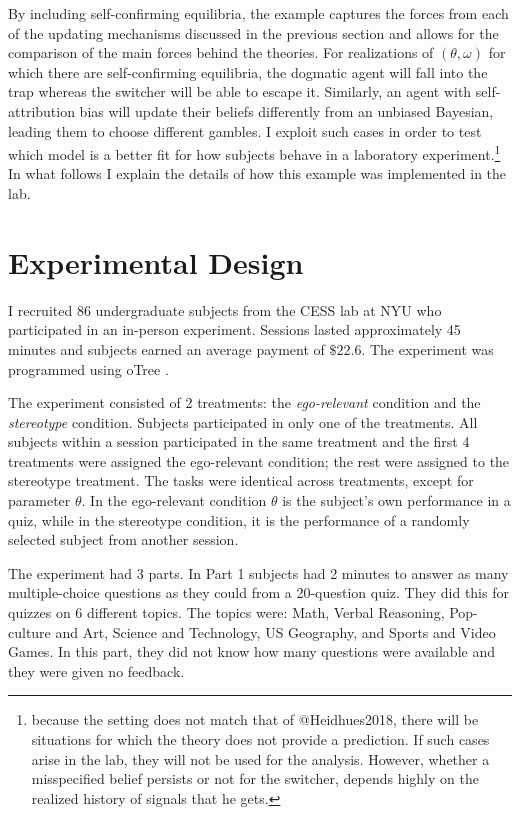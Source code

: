\documentclass[
  12pt,
]{article}
\begin{document}
By including self-confirming equilibria, the example captures the forces
from each of the updating mechanisms discussed in the previous section
and allows for the comparison of the main forces behind the theories.
For realizations of \((\theta, \omega)\) for which there are
self-confirming equilibria, the dogmatic agent will fall into the trap
whereas the switcher will be able to escape it. Similarly, an agent with
self-attribution bias will update their beliefs differently from an
unbiased Bayesian, leading them to choose different gambles. I exploit
such cases in order to test which model is a better fit for how subjects
behave in a laboratory
experiment.\footnote{because the setting does not match that of @Heidhues2018, there will be situations for which the theory does not provide a prediction. If such cases arise in the lab, they will not be used for the analysis. However, whether a misspecified belief persists or not for the switcher, depends highly on the realized history of signals that he gets.}
In what follows I explain the details of how this example was
implemented in the lab.

\hypertarget{experimental-design}{%
\section{Experimental Design}\label{experimental-design}}

I recruited 86 undergraduate subjects from the CESS lab at NYU who
participated in an in-person experiment. Sessions lasted approximately
45 minutes and subjects earned an average payment of \(\$22.6\). The
experiment was programmed using oTree \citep{otree}.

The experiment consisted of 2 treatments: the \emph{ego-relevant}
condition and the \emph{stereotype} condition. Subjects participated in
only one of the treatments. All subjects within a session participated
in the same treatment and the first 4 treatments were assigned the
ego-relevant condition; the rest were assigned to the stereotype
treatment. The tasks were identical across treatments, except for
parameter \(\theta\). In the ego-relevant condition \(\theta\) is the
subject's own performance in a quiz, while in the stereotype condition,
it is the performance of a randomly selected subject from another
session.

The experiment had 3 parts. In Part 1 subjects had 2 minutes to answer
as many multiple-choice questions as they could from a 20-question quiz.
They did this for quizzes on 6 different topics. The topics were: Math,
Verbal Reasoning, Pop-culture and Art, Science and Technology, US
Geography, and Sports and Video Games. In this part, they did not know
how many questions were available and they were given no feedback.
\end{document}
